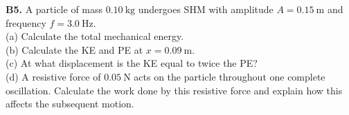 \begin{exercisebox}[7]
\vspace{0.4cm}

\textbf{B5.} A particle of mass $0.10\ \text{kg}$
undergoes SHM with amplitude $A = 0.15\ \text{m}$
and frequency $f = 3.0\ \text{Hz}$.\\[4pt]
(a) Calculate the total mechanical energy.\\
(b) Calculate the KE and PE at $x = 0.09\ \text{m}$.\\
(c) At what displacement is the KE equal to twice
the PE?\\
(d) A resistive force of $0.05\ \text{N}$ acts on
the particle throughout one complete oscillation.
Calculate the work done by this resistive force and
explain how this affects the subsequent motion.
\hfill{}

\end{exercisebox}
